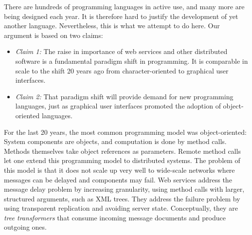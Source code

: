 
There are hundreds of programming languages in active use, and many
more are being designed each year. It is therefore hard to justify the
development of yet another language. Nevertheless, this is what we
attempt to do here.  Our argument is based on two claims:
\begin{itemize}
\item[] {\em Claim 1:} The raise in importance of web services and
other distributed software is a fundamental paradigm
shift in programming. It is comparable in scale to the shift 20 years ago
from character-oriented to graphical user interfaces.
\item[] {\em Claim 2:} That paradigm shift will provide demand
for new programming languages, just as graphical user interfaces
promoted the adoption of object-oriented languages.
\end{itemize}
For the last 20 years, the most common programming model was
object-oriented: System components are objects, and computation is
done by method calls.  Methods themselves take object references as
parameters. Remote method calls let one extend this programming model
to distributed systems. The problem of this model is that it does not
scale up very well to wide-scale networks where messages can be
delayed and components may fail. Web services address the message
delay problem by increasing granularity, using method calls with
larger, structured arguments, such as XML trees.  They address the
failure problem by using transparent replication and avoiding server
state.  Conceptually, they are {\em tree transformers} that consume
incoming message documents and produce outgoing ones.  


